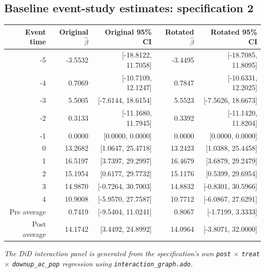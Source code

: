 \documentclass[10pt]{article}
\begin{document}
\subsection*{Baseline event-study estimates: specification 2}
\begin{center}
\scriptsize
\begin{tabular}{r rr rr}
\toprule
Event time & Original $\hat\beta$ & Original 95\% CI & Rotated $\hat\beta$ & Rotated 95\% CI \\
\midrule
-5 & -3.5532 & [-18.8122, 11.7058] & -3.4495 & [-18.7085, 11.8095] \\
-4 & 0.7069 & [-10.7109, 12.1247] & 0.7847 & [-10.6331, 12.2025] \\
-3 & 5.5005 & [-7.6144, 18.6154] & 5.5523 & [-7.5626, 18.6673] \\
-2 & 0.3133 & [-11.1680, 11.7945] & 0.3392 & [-11.1420, 11.8204] \\
-1 & 0.0000 & [0.0000, 0.0000] & 0.0000 & [0.0000, 0.0000] \\
0 & 13.2682 & [1.0647, 25.4718] & 13.2423 & [1.0388, 25.4458] \\
1 & 16.5197 & [3.7397, 29.2997] & 16.4679 & [3.6879, 29.2479] \\
2 & 15.1954 & [0.6177, 29.7732] & 15.1176 & [0.5399, 29.6954] \\
3 & 14.9870 & [-0.7264, 30.7003] & 14.8832 & [-0.8301, 30.5966] \\
4 & 10.9008 & [-5.9570, 27.7587] & 10.7712 & [-6.0867, 27.6291] \\
\midrule
Pre average & 0.7419 & [-9.5404, 11.0241] & 0.8067 & [-1.7199, 3.3333] \\
Post average & 14.1742 & [3.4492, 24.8992] & 14.0964 & [-3.8071, 32.0000] \\
\bottomrule
\end{tabular}
\end{center}
\medskip
\textit{The DiD interaction panel is generated from the specification's own \texttt{post} $\times$ \texttt{treat} $\times$ \texttt{downup\_ac\_pop} regression using \texttt{interaction\_graph.ado}.}
\clearpage
\end{document}
